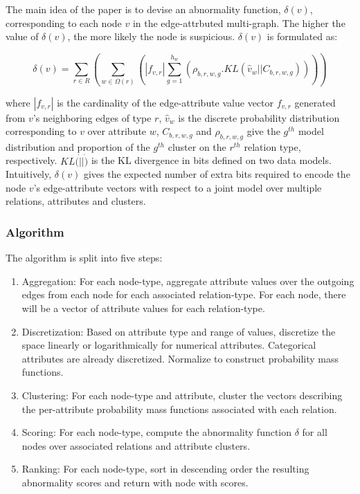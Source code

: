 \documentclass[11pt, oneside]{article}   	%
\begin{document}
\quad The main idea of the paper is to devise an abnormality function, $\delta(v)$, corresponding to each node $v$ in the edge-attrbuted multi-graph.
The higher the value of $\delta(v)$, the more likely the node is suspicious.
$\delta(v)$ is formulated as:

\begin{equation*}
\delta(v) = \sum_{r\in R} \left( \sum_{w \in \Omega(r)} \left(|f_{v,r}|\sum_{g=1}^{h_w} \left( \rho_{b,r,w,g}. KL(\hat{v}_w || C_{b,r,w,g})\right) \right)\right)
\end{equation*}

where $|f_{v,r}|$ is the cardinality of the edge-attribute value vector $f_{v,r}$ generated from $v$'s neighboring edges of type $r$, $\hat{v}_w$ is the discrete probability distribution corresponding to $v$ over attribute $w$, $C_{b,r,w,g}$ and $\rho_{b,r,w,g}$ give the $g^{th}$ model distribution and proportion of the $g^{th}$ cluster on the $r^{th}$ relation type, respectively.
$KL(\dot || \dot)$ is the KL divergence in bits defined on two data models.
Intuitively, $\delta(v)$ gives the expected number of extra bits required to encode the node $v$’s edge-attribute vectors with respect to a joint model over multiple relations, attributes and clusters.

\subsubsection*{Algorithm}

\quad The algorithm is split into five steps:
\begin{enumerate}
\item Aggregation: For each node-type, aggregate attribute values over the outgoing edges from each node for each associated relation-type.
For each node, there will be a vector of attribute values for each relation-type.
\item Discretization: Based on attribute type and range of values, discretize the space linearly or logarithmically for numerical attributes.
Categorical attributes are already discretized.
Normalize to construct probability mass functions.
\item Clustering: For each node-type and attribute, cluster the vectors describing the per-attribute probability mass functions associated with each relation.
\item Scoring: For each node-type, compute the abnormality function $\delta$ for all nodes over associated relations and attribute clusters.
\item Ranking: For each node-type, sort in descending order the resulting abnormality scores and return with node with scores.
\end{enumerate}
\end{document}

